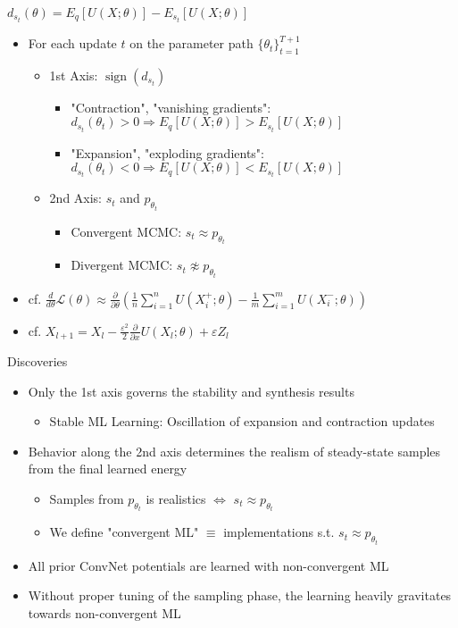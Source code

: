 \documentclass{beamer}
\DeclareMathOperator{\sign}{sign}
\begin{document}
\begin{frame}{$d_{s_t}(\theta)=E_q[U(X;\theta)]-E_{s_t}[U(X;\theta)]$}
\begin{itemize}
\item For each update $t$ on the parameter path $\{\theta_t\}^{T+1}_{t=1}$
\begin{itemize}
\item 1st Axis: $\sign(d_{s_t})$
\begin{itemize}
\item "Contraction", "vanishing gradients": $d_{s_t}(\theta_t)>0\Rightarrow E_q[U(X;\theta)]>E_{s_t}[U(X;\theta)]$
\item "Expansion", "exploding gradients": $d_{s_t}(\theta_t)<0\Rightarrow E_q[U(X;\theta)]<E_{s_t}[U(X;\theta)]$
\end{itemize}
\item 2nd Axis: $s_t$ and $p_{\theta_t}$
\begin{itemize}
\item Convergent MCMC: $s_t\approx p_{\theta_t}$
\item Divergent MCMC: $s_t\not\approx p_{\theta_t}$
\end{itemize}
\end{itemize}
\item cf. $\frac{d}{d\theta}\mathcal{L}(\theta)\approx\frac{\partial}{\partial\theta}(\frac{1}{n}\sum_{i=1}^n U(X_i^+;\theta)-\frac{1}{m}\sum_{i=1}^m U(X_i^-;\theta))$
\item cf. $X_{l+1}=X_l-\frac{\varepsilon^2}{2}\frac{\partial}{\partial x}U(X_l;\theta)+\varepsilon Z_l$
\end{itemize}
\end{frame}

\begin{frame}{Discoveries}
\begin{itemize}
\item Only the 1st axis governs the stability and synthesis results
\begin{itemize}
\item Stable ML Learning: Oscillation of expansion and contraction updates
\end{itemize}
\item Behavior along the 2nd axis determines the realism of steady-state samples from the final learned energy
\begin{itemize}
\item Samples from $p_{\theta_t}$ is realistics $\Leftrightarrow$ $s_t\approx p_{\theta_t}$
\item We define "convergent ML" $\equiv$ implementations s.t. $s_t\approx p_{\theta_t}$
\end{itemize}
\item All prior ConvNet potentials are learned
with non-convergent ML
\item Without proper tuning of the sampling phase, the learning
heavily gravitates towards non-convergent ML
\end{itemize}
\end{frame}
\end{document}
